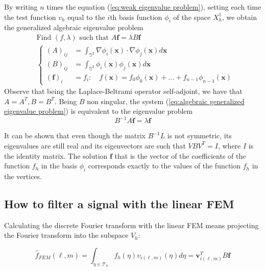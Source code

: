 By writing $n$ times the equation (\ref{eq:weak eigenvalue problem}), setting each time the test function $v_h$ equal to the $i$th basis function $\phi_i$ of the space $X_h^1$, we obtain the generalized algebraic eigenvalue problem
\begin{equation}\label{eq:algebraic generalized eigenvalue problem}
\begin{aligned}
&\text{Find }(f,\lambda)\text{ such that }A\mathbf f = \lambda B \mathbf f\\
&\begin{cases}
(A)_{ij} &= \int_{\mathbb S^2}\nabla \phi_i(\mathbf{x})\cdot \nabla \phi_j(\mathbf{x})d\mathbf{x}\\
(B)_{ij} &= \int_{\mathbb S^2} \phi_i(\mathbf{x}) \phi_j(\mathbf{x})d\mathbf{x}\\
(\mathbf f)_i &= f_i:\quad f(\mathbf x) = f_0\phi_0(\mathbf x)+ ... + f_{n-1}\phi_{n-1}(\mathbf x) 
\end{cases}
\end{aligned}
\end{equation}
Observe that being the Laplace-Beltrami operator self-adjoint, we have that $A=A^T, B=B^T$. Being $B$ non singular, the system (\ref{eq:algebraic generalized eigenvalue problem}) is equivalent to the eigenvalue problem
\begin{equation}\label{eq:algebraic  eigenvalue problem}
B^{-1}A\mathbf f = \lambda \mathbf f
\end{equation}

It can be shown \cite{Strang} that even though the matrix $B^{-1}L$ is not symmetric, its eigenvalues are still real and its eigenvectors are such that $VBV^T=I$, where $I$ is the identity matrix. The solution $\mathbf f$ that is the vector of the coefficients of the function $f_h$ in the basis $\phi_i$ corresponds exactly to the values of the function $f_h$ in the vertices. 

\subsection{How to filter a signal with the linear FEM}
Calculating the discrete Fourier transform with the linear FEM means projecting the Fourier transform into the subspace $V_h$:

\begin{equation}\label{FEM fourier}
	\hat f_{FEM} (\ell, m) = \int_{\eta \in \mathcal T_h} f_h(\eta) v_{i(\ell, m)}(\eta) d\eta = \mathbf v_{i(\ell, m)}^T B \mathbf f
\end{equation}

